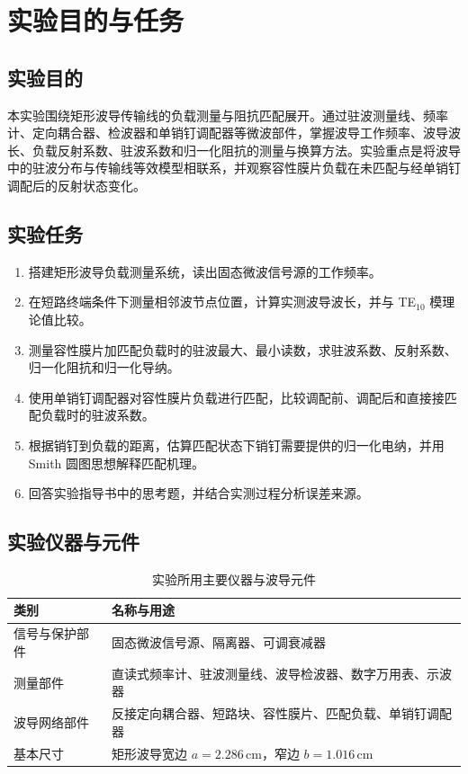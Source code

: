 \documentclass[UTF8]{ctexart}
\begin{document}
\makecover
\makecoveri
\zdx

\section{实验目的与任务}

\subsection{实验目的}

本实验围绕矩形波导传输线的负载测量与阻抗匹配展开。通过驻波测量线、频率计、定向耦合器、检波器和单销钉调配器等微波部件，掌握波导工作频率、波导波长、负载反射系数、驻波系数和归一化阻抗的测量与换算方法。实验重点是将波导中的驻波分布与传输线等效模型相联系，并观察容性膜片负载在未匹配与经单销钉调配后的反射状态变化。

\subsection{实验任务}

\begin{enumerate}
  \item 搭建矩形波导负载测量系统，读出固态微波信号源的工作频率。
  \item 在短路终端条件下测量相邻波节点位置，计算实测波导波长，并与 TE$_{10}$ 模理论值比较。
  \item 测量容性膜片加匹配负载时的驻波最大、最小读数，求驻波系数、反射系数、归一化阻抗和归一化导纳。
  \item 使用单销钉调配器对容性膜片负载进行匹配，比较调配前、调配后和直接接匹配负载时的驻波系数。
  \item 根据销钉到负载的距离，估算匹配状态下销钉需要提供的归一化电纳，并用 Smith 圆图思想解释匹配机理。
  \item 回答实验指导书中的思考题，并结合实测过程分析误差来源。
\end{enumerate}

\subsection{实验仪器与元件}

\begin{table}[H]
  \centering
  \caption{实验所用主要仪器与波导元件}
  \label{tab:instrument}
  \begin{tabular}{ll}
    \toprule
    类别 & 名称与用途 \\
    \midrule
    信号与保护部件 & 固态微波信号源、隔离器、可调衰减器 \\
    测量部件 & 直读式频率计、驻波测量线、波导检波器、数字万用表、示波器 \\
    波导网络部件 & 反接定向耦合器、短路块、容性膜片、匹配负载、单销钉调配器 \\
    基本尺寸 & 矩形波导宽边 $a=2.286\,\mathrm{cm}$，窄边 $b=1.016\,\mathrm{cm}$ \\
    \bottomrule
  \end{tabular}
\end{table}
\end{document}
